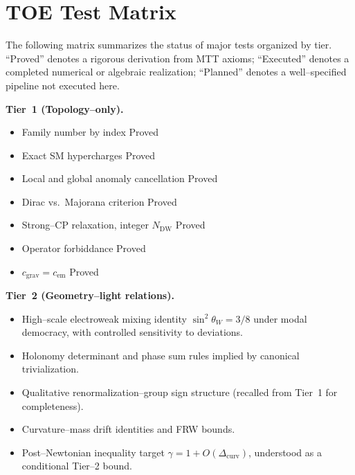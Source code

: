 \documentclass[11pt]{article}
\begin{document}
\section{TOE Test Matrix}

The following matrix summarizes the status of major tests organized by
tier. ``Proved'' denotes a rigorous derivation from MTT axioms; 
``Executed'' denotes a completed numerical or algebraic realization;
``Planned'' denotes a well--specified pipeline not executed here.

\medskip

\noindent\textbf{Tier~1 (Topology--only).}
\begin{itemize}
  \item Family number by index \hfill Proved
  \item Exact SM hypercharges \hfill Proved
  \item Local and global anomaly cancellation \hfill Proved
  \item Dirac vs.\ Majorana criterion \hfill Proved
  \item Strong--CP relaxation, integer $N_{\mathrm{DW}}$ \hfill Proved
  \item Operator forbiddance \hfill Proved
  \item $c_{\mathrm{grav}} = c_{\mathrm{em}}$ \hfill Proved
\end{itemize}

\noindent\textbf{Tier~2 (Geometry--light relations).}
\begin{itemize}
  \item High--scale electroweak mixing identity
        $\sin^2\theta_W = 3/8$ under modal democracy, with controlled
        sensitivity to deviations.
  \item Holonomy determinant and phase sum rules implied by canonical
        trivialization.
  \item Qualitative renormalization--group sign structure
        (recalled from Tier~1 for completeness).
  \item Curvature--mass drift identities and FRW bounds.
  \item Post--Newtonian inequality target
        $\gamma = 1 + O(\Delta_{\mathrm{curv}})$, understood as a
        conditional Tier--2 bound.
\end{itemize}
\end{document}
